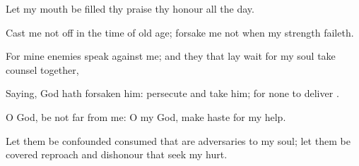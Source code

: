 {\par }{\Q {}Let my
mouth be
filled
{} thy
praise
{} thy
honour all the
day.


\par }{\Q {}Cast me not
off in the
time of old
age;
forsake me not when my
strength
faileth.


\par }{\Q {}For mine
enemies
speak against me; and they that lay
wait for my
soul take
counsel
together,


\par }{\Q {}Saying,
God hath
forsaken him:
persecute and
take him; for
{} none to
deliver
{}.


\par }{\Q {}O
God, be not
far from me: O my
God, make
haste for my
help.


\par }{\Q {}Let them be
confounded
{}
consumed that are
adversaries to my
soul; let them be
covered
{}
reproach and
dishonour that
seek my
hurt.


\par }{\BB \par }

